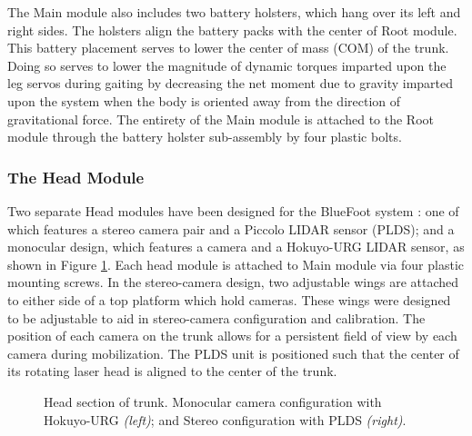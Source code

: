 			
				The Main module also includes two battery holsters, which hang over its left and right sides. The holsters align the battery packs with the center of Root module. This battery placement serves to lower the center of mass (COM) of the trunk. Doing so serves to lower the magnitude of dynamic torques imparted upon the leg servos during gaiting by decreasing the net moment due to gravity imparted upon the system when the body is oriented away from the direction of gravitational force. The entirety of the Main module is attached to the Root module through the battery holster sub-assembly by four plastic bolts.
		
			\subsubsection{The Head Module}

				Two separate Head modules have been designed for the BlueFoot system : one of which features a stereo camera pair and a Piccolo LIDAR sensor (PLDS); and a monocular design, which features a camera and a Hokuyo-URG LIDAR sensor, as shown in Figure \ref{fig::head_module}. Each head module is attached to Main module via four plastic mounting screws. In the stereo-camera design, two adjustable wings are attached to either side of a top platform which hold cameras. These wings were designed to be adjustable to aid in stereo-camera configuration and calibration. The position of each camera on the trunk allows for a persistent field of view by each camera during mobilization. The PLDS unit is positioned such that the center of its rotating laser head is aligned to the center of the trunk. 

				\begin{figure}[h!]
					\centering
					\caption{Head section of trunk. Monocular camera configuration with Hokuyo-URG \emph{(left)}; and Stereo configuration with PLDS \emph{(right)}. }
					\label{fig::head_module}
				\end{figure}		

